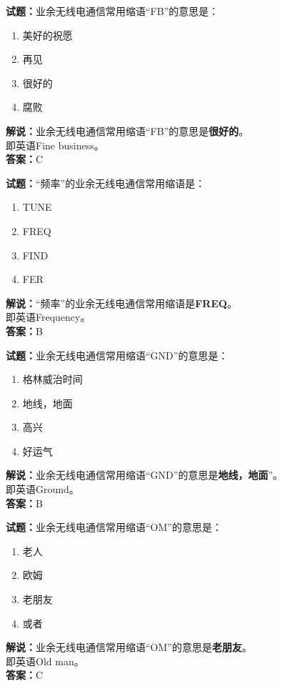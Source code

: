 \documentclass{ctexbook}
\begin{document}
\bigskip


\noindent\textbf{试题：}业余无线电通信常用缩语“FB”的意思是：
\begin{enumerate}[leftmargin=3em]
\item 美好的祝愿
\item 再见
\item 很好的
\item 腐败
\end{enumerate}
\noindent\textbf{解说：}业余无线电通信常用缩语“FB”的意思是\textbf{很好的}。\\即英语Fine business。\\\noindent\textbf{答案：}C

\bigskip


\noindent\textbf{试题：}“频率”的业余无线电通信常用缩语是：
\begin{enumerate}[leftmargin=3em]
\item TUNE
\item FREQ
\item FIND
\item FER
\end{enumerate}
\noindent\textbf{解说：}“频率”的业余无线电通信常用缩语是\textbf{FREQ}。\\即英语Frequency。\\\noindent\textbf{答案：}B

\bigskip


\noindent\textbf{试题：}业余无线电通信常用缩语“GND”的意思是：
\begin{enumerate}[leftmargin=3em]
\item 格林威治时间
\item 地线，地面
\item 高兴
\item 好运气
\end{enumerate}
\noindent\textbf{解说：}业余无线电通信常用缩语“GND”的意思是\textbf{地线，地面}”。\\即英语Ground。\\\noindent\textbf{答案：}B

\bigskip


\noindent\textbf{试题：}业余无线电通信常用缩语“OM”的意思是：
\begin{enumerate}[leftmargin=3em]
\item 老人
\item 欧姆
\item 老朋友
\item 或者
\end{enumerate}
\noindent\textbf{解说：}业余无线电通信常用缩语“OM”的意思是\textbf{老朋友}。\\即英语Old man。\\\noindent\textbf{答案：}C
\end{document}
